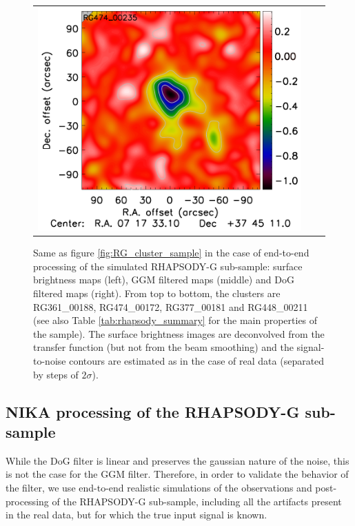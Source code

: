\documentclass[twocolumn,traditabstract]{aa}
\begin{document}
\begin{figure}[h]
{\begin{tabular}{lll}
\includegraphics[trim=2.3cm 0.7cm 0cm 0cm, clip=true, scale=1]{Figure/DoG_RG474_00235_Ymap_zobs0p4_processed_15_15_45.pdf} \\
\end{tabular}}
\caption{\footnotesize{Same as figure \ref{fig:RG_cluster_sample} in the case of end-to-end processing of the simulated RHAPSODY-G sub-sample: surface brightness maps (left), GGM filtered maps (middle) and DoG filtered maps (right). From top to bottom, the clusters are RG361\_00188, RG474\_00172, RG377\_00181 and RG448\_00211 (see also Table \ref{tab:rhapsody_summary} for the main properties of the sample). The surface brightness images are deconvolved from the transfer function (but not from the beam smoothing) and the signal-to-noise contours are estimated as in the case of real data (separated by steps of $2 \sigma$).}}
\label{fig:RG_cluster_sample_proc}
\end{figure}

\subsection{NIKA processing of the RHAPSODY-G sub-sample}
While the DoG filter is linear and preserves the gaussian nature of the noise, this is not the case for the GGM filter. Therefore, in order to validate the behavior of the filter, we use end-to-end realistic simulations of the observations and post-processing of the RHAPSODY-G sub-sample, including all the artifacts present in the real data, but for which the true input signal is known.
\end{document}
